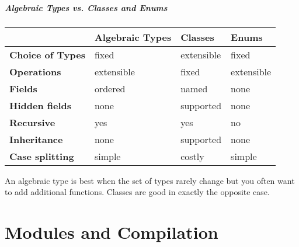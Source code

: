 \documentclass{plt}
\begin{document}
\begin{frame}
  \frametitle{Algebraic Types vs. Classes and Enums}

\begin{tabular}{llll}
\toprule
& \textbf{Algebraic Types} & \textbf{Classes} & \textbf{Enums} \\
\midrule
\textbf{Choice of Types} & fixed & extensible & fixed \\
\textbf{Operations} & extensible & fixed & extensible \\[5pt]
\textbf{Fields} & ordered & named & none \\
\textbf{Hidden fields} & none & supported & none \\
\textbf{Recursive} & yes & yes & no \\
\textbf{Inheritance} & none & supported & none \\
\textbf{Case splitting} & simple & costly & simple \\
\bottomrule
\end{tabular}

\medskip

An algebraic type is best when the set of types rarely change but you
often want to add additional functions.  Classes are good in exactly
the opposite case.

\end{frame}

\part{Modules and Compilation}
\end{document}
